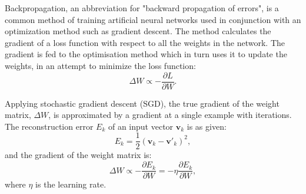 \documentclass{article}
\begin{document}
Backpropagation, an abbreviation for "backward propagation of errors", is a common method of training artificial neural networks used in conjunction with an optimization method such as gradient descent.
The method calculates the gradient of a loss function with respect to all the weights in the network.
The gradient is fed to the optimisation method which in turn uses it to update the weights, in an attempt to minimize the loss function:
\begin{equation}
\Delta W \propto -\frac{\partial L}{\partial W}.
\end{equation}

Applying stochastic gradient descent (SGD), the true gradient of the weight matrix, $\Delta W$, is approximated by a gradient at a single example with iterations.
The reconstruction error $E_k$ of an input vector $\mathbf{v}_k$ is as given:
\begin{equation}
E_k = \frac{1}{2}(\mathbf{v}_k - \mathbf{v'}_k)^2,
\end{equation}
and the gradient of the weight matrix is:
\begin{equation}
\Delta W \propto -\frac{\partial E_k}{\partial W}=-\eta \frac{\partial E_k}{\partial W},
\end{equation}
where $\eta$ is the learning rate.
\end{document}
